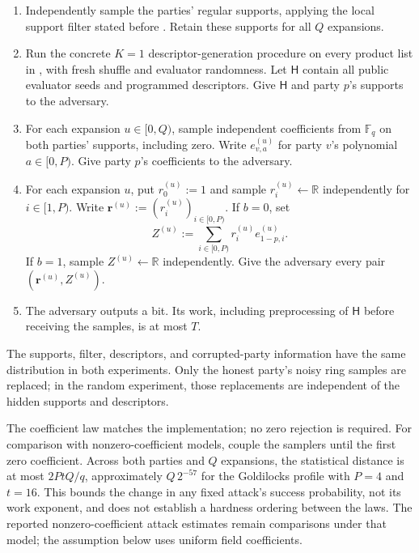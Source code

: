\begin{enumerate}
 \item Independently sample the parties' regular supports, applying the
 local support filter stated before
 .
 Retain these supports for all $Q$ expansions.
 \item Run the concrete $K=1$ descriptor-generation procedure on every
 product list in , with fresh
 shuffle and evaluator randomness. Let $\mathsf H$ contain all public
 evaluator seeds and programmed descriptors.
 Give $\mathsf H$ and party $p$'s supports to the adversary.
 \item For each expansion $u\in[0,Q)$, sample independent coefficients
 from $\mathbb F_q$ on both parties' supports, including zero. Write $e^{(u)}_{v,a}$ for
 party $v$'s polynomial $a\in[0,P)$. Give party $p$'s coefficients
 to the adversary.
 \item For each expansion $u$, put $r_0^{(u)}:=1$ and sample
 $r_i^{(u)}\gets\mathbb R$ independently for $i\in[1,P)$.
 Write $\mathbf r^{(u)}:=(r_i^{(u)})_{i\in[0,P)}$.
 If $b=0$, set
 \[
 Z^{(u)}:=\sum_{i\in[0,P)}r_i^{(u)}e^{(u)}_{1-p,i}.
 \]
 If $b=1$, sample $Z^{(u)}\gets\mathbb R$ independently.
 Give the adversary every pair $(\mathbf r^{(u)},Z^{(u)})$.
 \item The adversary outputs a bit. Its work, including preprocessing of
 $\mathsf H$ before receiving the samples, is at most $T$.
\end{enumerate}

The supports, filter, descriptors, and corrupted-party information have the
same distribution in both experiments. Only the honest party's noisy ring
samples are replaced; in the random experiment, those replacements are
independent of the hidden supports and descriptors.

The coefficient law matches the implementation; no zero rejection is required.
For comparison with nonzero-coefficient models, couple the samplers until
the first zero coefficient. Across both parties and $Q$ expansions, the
statistical distance is at most $2PtQ/q$, approximately $Q\,2^{-57}$ for
the Goldilocks profile with $P=4$ and $t=16$.
This bounds the change in any fixed attack's success probability, not its
work exponent, and does not establish a hardness ordering between the laws.
The reported nonzero-coefficient attack estimates remain comparisons under
that model; the assumption below uses uniform field coefficients.

